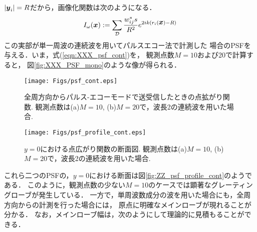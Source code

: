 $|\mbox{\boldmath $y$}_i|=R$だから，画像化関数は次のようになる．
\begin{equation}
	I_\omega(\mbox{\boldmath $x$})
		:=
	\sum_{\cal D} 
	\frac{w_{ij}^*s}{R^2}
	e^{
	2ik
	\left(
		r_i(\mbox{\boldmath $x$})-R
	\right)
	}
	\label{eqn:XXX_PSF_cont}
\end{equation}
この実部が単一周波の連続波を用いてパルスエコー法で計測した
場合のPSFを与える．いま，式(\ref{eqn:XXX_psf_cont})を，
観測点数$M=10$および20で計算すると，
図\ref{fig:XXX_PSF_mono}のような像が得られる．
\begin{figure}[h]
	\begin{center}
	\texttt{[image: Figs/psf\_cont.eps]} 
	\end{center}
	\caption{
	全周方向からパルス-エコーモードで送受信したときの点拡がり関数.
	観測点数は(a)$M=10$, (b)$M=20$で，波長2の連続波を用いた場合.} 
	\label{fig:XXX_psf_cont}
\end{figure}
\begin{figure}[h]
	\begin{center}
	\texttt{[image: Figs/psf\_profile\_cont.eps]} 
	\end{center}
	\caption{$y=0$における点広がり関数の断面図. 
	観測点数は(a)$M=10$, (b)$M=20$で，波長2の連続波を用いた場合.}
	\label{fig:XXX_psf_profile_cont}
\end{figure}
これら二つのPSFの，$y=0$における断面は図\ref{fig:ZZ_psf_profile_cont}のようである．
このように，観測点数の少ない$M=10$のケースでは顕著なグレーティングローブが発生している．
一方で，単周波数成分の波を用いた場合にも，全周方向からの計測を行った場合には，
原点に明確なメインローブが現れることが分かる．
なお，メインローブ幅は，次のようにして理論的に見積もることができる．

